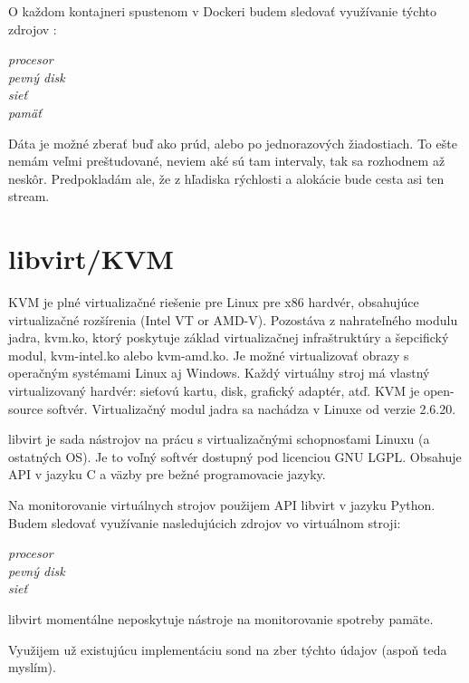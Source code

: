 \documentclass[11pt,final,oneside]{fithesis}
\begin{document}
O každom kontajneri spustenom v Dockeri budem sledovať využívanie týchto zdrojov :
\begin{description}
\item[\emph{procesor}]
\item[\emph{pevný disk}]
\item[\emph{sieť}]
\item[\emph{pamäť}]
\end{description}

  
Dáta je možné zberať buď ako prúd, alebo po jednorazových žiadostiach. To ešte nemám veľmi preštudované, neviem aké sú tam intervaly, tak sa rozhodnem až neskôr.
Predpokladám ale, že z hľadiska rýchlosti a alokácie bude cesta asi ten stream.

\section{libvirt/KVM}
KVM\footnotemark{} je plné virtualizačné riešenie pre Linux pre x86 hardvér, obsahujúce virtualizačné rozšírenia (Intel VT or AMD-V).
Pozostáva z nahrateľného modulu jadra, kvm.ko, ktorý poskytuje základ virtualizačnej infraštruktúry a šepcifický modul, kvm-intel.ko alebo kvm-amd.ko. Je možné virtualizovať obrazy 
s operačným systémami Linux aj Windows. Každý virtuálny stroj má vlastný virtualizovaný hardvér: sieťovú kartu, disk, grafický adaptér, atď. KVM je open-source softvér. Virtualizačný modul jadra
sa nachádza v Linuxe od verzie 2.6.20.\cite{torque}

libvirt je sada nástrojov na prácu s virtualizačnými schopnosťami Linuxu (a ostatných OS). Je to voľný softvér dostupný pod licenciou GNU LGPL. 
Obsahuje API v jazyku C a väzby pre bežné programovacie jazyky.\cite{libvirt}

Na monitorovanie virtuálnych strojov použijem API libvirt v jazyku Python. Budem sledovať využívanie nasledujúcich zdrojov vo virtuálnom stroji:
\begin{description}
\item[\emph{procesor}]
\item[\emph{pevný disk}]
\item[\emph{sieť}]
\end{description}

libvirt momentálne neposkytuje nástroje na monitorovanie spotreby pamäte.


Využijem už existujúcu implementáciu sond na zber týchto údajov (aspoň teda myslím).
\end{document}
